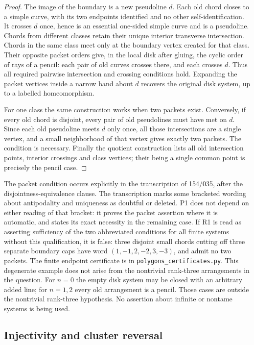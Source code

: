 \begin{proof}
The image of the boundary is a new pseudoline $d$.  Each old chord
closes to a simple curve, with its two endpoints identified and no
other self-identification.  It crosses $d$ once, hence is an essential
one-sided simple curve and is a pseudoline.  Chords from different
classes retain their unique interior transverse intersection.  Chords
in the same class meet only at the boundary vertex created for that
class.  Their opposite packet orders give, in the local disk after
gluing, the cyclic order of rays of a pencil: each pair of old curves
crosses there, and each crosses $d$.  Thus all required pairwise
intersection and crossing conditions hold.  Expanding the packet
vertices inside a narrow band about $d$ recovers the original disk
system, up to a labelled homeomorphism.

For one class the same construction works when two packets exist.
Conversely, if every old chord is disjoint, every pair of old
pseudolines must have met on $d$.  Since each old pseudoline meets
$d$ only once, all those intersections are a single vertex, and a
small neighborhood of that vertex gives exactly two packets.  The
condition is necessary.  Finally the quotient construction lists all
old intersection points, interior crossings and class vertices;
their being a single common point is precisely the pencil case.
\end{proof}

The packet condition occurs explicitly in the transcription of
154/035, after the disjointness-equivalence clause.  The transcription
marks some bracketed wording about antipodality and uniqueness as
doubtful or deleted.  P1 does not depend on either reading of that
bracket: it proves the packet assertion where it is automatic, and
states its exact necessity in the remaining case.  If R1 is read as
asserting sufficiency of the two abbreviated conditions for all finite
systems without this qualification, it is false: three disjoint small
chords cutting off three separate boundary caps have word
$(1,-1,2,-2,3,-3)$, and admit no two packets.  The finite endpoint
certificate is in \texttt{polygons\_certificates.py}.  This degenerate
example does not arise from the nontrivial rank-three arrangements in
the question.  For $n=0$ the empty disk system may be closed with an
arbitrary added line; for $n=1,2$ every old arrangement is a pencil.
Those cases are outside the nontrivial rank-three hypothesis.  No
assertion about infinite or nontame systems is being used.

\subsection{Injectivity and cluster reversal}

